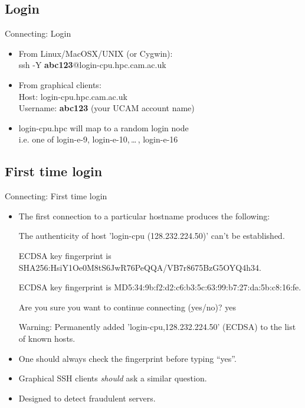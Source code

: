 \subsection{Login}
\begin{frame}{Connecting: Login}
\begin{itemize}
\item From Linux/MacOSX/UNIX (or Cygwin):\hfill\\
\alert{ssh -Y \textbf{abc123}@login-cpu.hpc.cam.ac.uk}
\pause
\item From graphical clients:\hfill\\
Host: \alert{login-cpu.hpc.cam.ac.uk}\hfill\\
Username: \alert{\textbf{abc123}} (your UCAM account name)
\pause
\item login-cpu.hpc will map to a random login node\hfill\\
\alert{i.e. one of login-e-9, login-e-10,\,\ldots\,, login-e-16}
\end{itemize}
\end{frame}

\subsection{First time login}
\begin{frame}{Connecting: First time login}
\begin{itemize}
\item{The first connection to a particular hostname produces the following:}
\begin{semiverbatim}\tiny
  The authenticity of host 'login-cpu (128.232.224.50)' can't be established.

  
  {ECDSA key fingerprint is SHA256:HsiY1Oe0M8tS6JwR76PeQQA/VB7r8675BzG5OYQ4h34.}
  
  {ECDSA key fingerprint is MD5:34:9b:f2:d2:c6:b3:5c:63:99:b7:27:da:5b:c8:16:fe.}
  

  Are you sure you want to continue connecting (yes/no)? {yes}

Warning: Permanently added 'login-cpu,128.232.224.50' (ECDSA) to the list of known hosts.
 \end{semiverbatim}
\smallskip\item{\alert{One should always check the fingerprint before typing ``yes''.}}
\item{Graphical SSH clients \emph{should} ask a similar question.}
\item{Designed to detect fraudulent servers.}
\end{itemize}
\end{frame}

